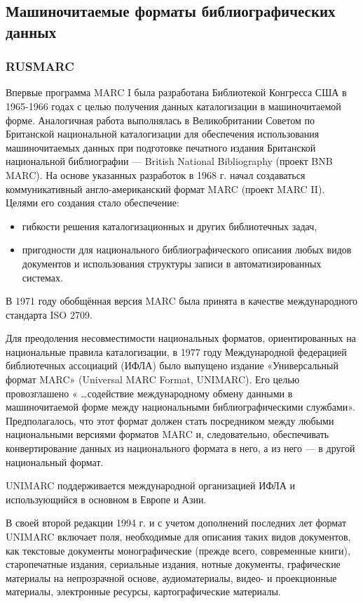 \subsection{Машиночитаемые форматы библиографических данных}

\subsubsection*{RUSMARC}

Впервые программа MARC I была разработана Библиотекой Конгресса США в 1965-1966 годах с целью получения данных каталогизации в машиночитаемой форме. Аналогичная работа выполнялась в Великобритании Советом по Британской национальной каталогизации для обеспечения использования машиночитаемых данных при подготовке печатного издания Британской национальной библиографии — British National Bibliography (проект BNB MARC). На основе указанных разработок в 1968 г. начал создаваться коммуникативный англо-американский формат MARC (проект MARC II). Целями его создания стало обеспечение:

\begin{itemize}
	\item гибкости решения каталогизационных и других библиотечных задач,
	\item пригодности для национального библиографического описания любых видов документов и использования структуры записи в автоматизированных системах.
\end{itemize}

В 1971 году обобщённая версия MARC была принята в качестве международного стандарта ISO 2709.

Для преодоления несовместимости национальных форматов, ориентированных на национальные правила каталогизации, в 1977 году Международной федерацией библиотечных ассоциаций (ИФЛА) было выпущено издание «Универсальный формат MARC» (Universal MARC Format, UNIMARC). Его целью провозглашено « …содействие международному обмену данными в машиночитаемой форме между национальными библиографическими службами». Предполагалось, что этот формат должен стать посредником между любыми национальными версиями форматов MARC и, следовательно, обеспечивать конвертирование данных из национального формата в него, а из него — в другой национальный формат.

UNIMARC поддерживается международной организацией ИФЛА и использующийся в основном в Европе и Азии.

В своей второй редакции 1994 г. и с учетом дополнений последних лет формат UNIMARC включает поля, необходимые для описания таких видов документов, как текстовые документы монографические (прежде всего, современные книги), старопечатные издания, сериальные издания, нотные документы, графические материалы на непрозрачной основе, аудиоматериалы, видео- и проекционные материалы, электронные ресурсы, картографические материалы.

